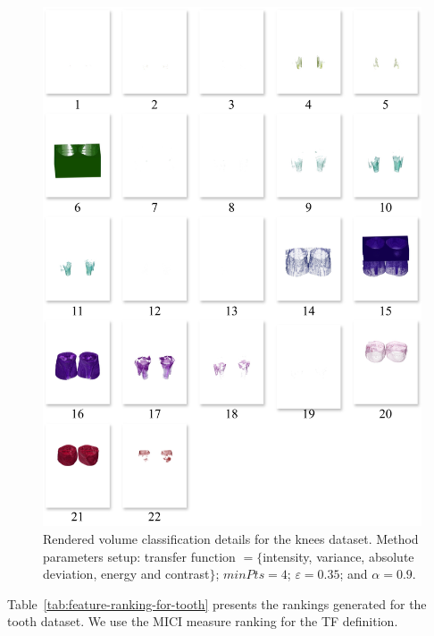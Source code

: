 \begin{figure}[htb!]
    \centering
    \includegraphics[width=\columnwidth]{figs/knees-clusters.jpg} 
     \caption{Rendered volume classification details for the knees dataset. Method parameters setup: transfer function $=\{$intensity,  variance, absolute deviation, energy and contrast$\}$; $minPts = 4$; $\varepsilon = 0.35$; and $\alpha = 0.9$.}
    \label{fig:knees-clusters}
\end{figure}

Table~\ref{tab:feature-ranking-for-tooth} presents the rankings generated for the tooth dataset.  We use the MICI measure ranking for the TF definition.

